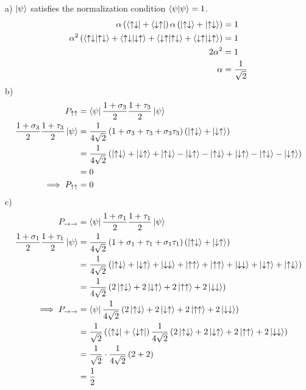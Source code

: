 \documentclass[12pt]{book} %
\numberwithin{equation}{chapter}
\def\a{\alpha}
\def\s{\sigma}
\def\t{\tau}
\begin{document}
\begin{solbox}
a) $\ket{\psi}$ satisfies the normalization condition $\braket{\psi}=1$.
\begin{align*}
\a\left(\bra{\uparrow\downarrow}+\bra{\downarrow\uparrow}\right)\a\left(\ket{\uparrow\downarrow}+\ket{\uparrow\downarrow}\right)&=1\\
\a^{2}\left(\braket{\uparrow\downarrow}+\braket{\uparrow\downarrow}{\downarrow\uparrow}+\braket{\downarrow\uparrow}{\uparrow\downarrow}+\braket{\downarrow\uparrow}\right)&=1\\
2\a^{2}&=1\\
\a&=\frac{1}{\sqrt{2}}
\end{align*}
b)
\begin{align*}
P_{\uparrow\uparrow}&=\bra{\psi}\frac{1+\s_{3}}{2}\frac{1+\t_{3}}{2}\ket{\psi}\\
\frac{1+\s_{3}}{2}\frac{1+\t_{3}}{2}\ket{\psi}&=\frac{1}{4\sqrt{2}}\left(1+\s_{3}+\t_{3}+\s_{3}\t_{3}\right)\left(\ket{\uparrow\downarrow}+\ket{\downarrow\uparrow}\right)\\
&=\frac{1}{4\sqrt{2}}\left(\ket{\uparrow\downarrow}+\ket{\downarrow\uparrow}+\ket{\uparrow\downarrow}-\ket{\downarrow\uparrow}-\ket{\uparrow\downarrow}+\ket{\downarrow\uparrow}-\ket{\uparrow\downarrow}-\ket{\downarrow\uparrow}\right)\\
&=0\\
\implies P_{\uparrow\uparrow}&=0
\end{align*}
c)
\begin{align*}
P_{\rightarrow\rightarrow}&=\bra{\psi}\frac{1+\s_{1}}{2}\frac{1+\t_{1}}{2}\ket{\psi}\\
\frac{1+\s_{1}}{2}\frac{1+\t_{1}}{2}\ket{\psi}&=\frac{1}{4\sqrt{2}}\left(1+\s_{1}+\t_{1}+\s_{1}\t_{1}\right)\left(\ket{\uparrow\downarrow}+\ket{\downarrow\uparrow}\right)\\
&=\frac{1}{4\sqrt{2}}\left(\ket{\uparrow\downarrow}+\ket{\downarrow\uparrow}+\ket{\downarrow\downarrow}+\ket{\uparrow\uparrow}+\ket{\uparrow\uparrow}+\ket{\downarrow\downarrow}+\ket{\downarrow\uparrow}+\ket{\uparrow\downarrow}\right)\\
&=\frac{1}{4\sqrt{2}}\left(2\ket{\uparrow\downarrow}+2\ket{\downarrow\uparrow}+2\ket{\uparrow\uparrow}+2\ket{\downarrow\downarrow}\right)\\
\implies P_{\rightarrow\rightarrow}&=\bra{\psi}\frac{1}{4\sqrt{2}}\left(2\ket{\uparrow\downarrow}+2\ket{\downarrow\uparrow}+2\ket{\uparrow\uparrow}+2\ket{\downarrow\downarrow}\right)\\
&=\frac{1}{\sqrt{2}}\left(\bra{\uparrow\downarrow}+\bra{\downarrow\uparrow}\right)\frac{1}{4\sqrt{2}}\left(2\ket{\uparrow\downarrow}+2\ket{\downarrow\uparrow}+2\ket{\uparrow\uparrow}+2\ket{\downarrow\downarrow}\right)\\
&=\frac{1}{\sqrt{2}}\cdot\frac{1}{4\sqrt{2}}\left(2+2\right)\\
&=\frac{1}{2}
\end{align*}
\end{solbox}
\end{document}
